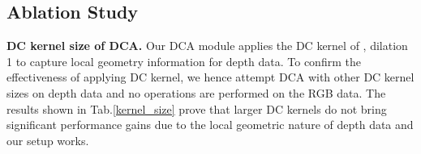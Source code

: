 \documentclass[10pt,twocolumn,letterpaper]{article}
\begin{document}
\subsection{Ablation Study}
\textbf{DC kernel size of DCA.}
Our DCA module applies the DC kernel of , dilation 1 to capture local geometry information for depth data.
To confirm the effectiveness of applying  DC kernel, we hence attempt DCA with other DC kernel
sizes on depth data and no operations are performed on the RGB data. The results shown in Tab.\ref{kernel_size}
prove that larger DC kernels do not bring significant performance gains due to
the local geometric nature of depth data and our setup works.

\begin{table}
   \centering
   \caption{The results of DCA with different DC kernel sizes on NYUDv2 test set.}
   \label{nyud2}
   \label{kernel_size}
\end{table}


\begin{table}[]
   \centering
   \caption{Ablation study on DCA and EDCA modules on NYUDv2 test set.}
   \label{Ablation1}
\end{table}
\end{document}
